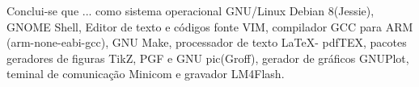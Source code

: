 Conclui-se que ... 
como sistema operacional GNU/Linux Debian 8(Jessie), 
GNOME Shell, 
Editor de texto e códigos fonte VIM, 
compilador GCC para ARM (arm-none-eabi-gcc), 
GNU Make, 
processador de texto \LaTeX - pdfTEX, 
pacotes geradores de figuras TikZ, PGF e GNU pic(Groff), 
gerador de gráficos GNUPlot, 
teminal de comunicação Minicom e 
gravador LM4Flash.


